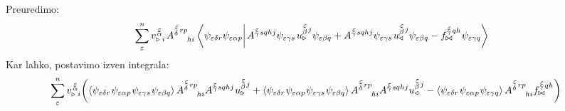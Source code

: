 Preuredimo:
\begin{equation*}
   \sum^n_\varepsilon
   v^{\mkern 2mu \substack{\varepsilon \\[-0.63mm] \alpha \\[-0.2mm]}}_{\triangleright \mkern5mu i} \mkern2mu     A^{\substack{\mkern2mu \varepsilon \\[0.12mm] \delta} \mkern2mu r p}_{\mkern29mu hi}
   \braket{
      \psi_{ \varepsilon \delta r}     \psi_{\varepsilon \alpha p} }
   {
      \mkern2mu A^{\substack{\mkern2mu \varepsilon \\[-0.59mm] \gamma} \mkern2mu s q h j}     \psi_{\varepsilon \gamma s} \mkern2mu
      u^{\substack{\mkern2mu \varepsilon \\[0.09mm] \beta} \mkern2mu j}_\triangleright     \psi_{\varepsilon \beta q}
      +
      A^{\substack{\mkern2mu \varepsilon \\[-0.59mm] \gamma} \mkern2mu s q h j}    \psi_{\varepsilon \gamma s} \mkern2mu
      u^{\substack{\mkern2mu \varepsilon \\[0.09mm] \beta} \mkern2mu j}_\triangleleft     \psi_{\varepsilon \beta q}
      -
      f^{\substack{\mkern2mu \varepsilon \\[-0.59mm] \gamma} \mkern2mu q h}_{\bowtie} \mkern1mu    \psi_{\varepsilon \gamma q} }
\end{equation*}
Kar lahko, postavimo izven integrala:
\begin{equation*}
   \mkern-20mu \sum^n_\varepsilon   v^{\mkern 2mu \substack{\varepsilon \\[-0.5mm] \alpha \\[-0.2mm]}}_{\triangleright \mkern5mu i}
   \qty( \expval{ \psi_{ \varepsilon \delta r} \mkern1mu    \psi_{\varepsilon \alpha p} \mkern1mu    \psi_{\varepsilon \gamma s} \mkern1mu    \psi_{\varepsilon \beta q} }
   A^{\substack{\mkern2mu \varepsilon \\[0.12mm] \delta} \mkern2mu r p}_{\mkern29mu hi}    A^{\substack{\mkern2mu \varepsilon \\[-0.59mm] \gamma} \mkern2mu s q h j} \mkern1mu     u^{\substack{\mkern2mu \varepsilon \\[0.14mm] \beta} \mkern2mu j}_\triangleright
   +
   \expval{ \psi_{ \varepsilon \delta r} \mkern1mu    \psi_{\varepsilon \alpha p} \mkern1mu    \psi_{\varepsilon \gamma s} \mkern1mu    \psi_{\varepsilon \beta q} }
   A^{\substack{\mkern2mu \varepsilon \\[0.12mm] \delta} \mkern2mu r p}_{\mkern29mu hi}    A^{\substack{\mkern2mu \varepsilon \\[-0.59mm] \gamma} \mkern2mu s q h j}    u^{\substack{\mkern2mu \varepsilon \\[0.14mm] \beta} \mkern2mu j}_\triangleleft
   -
   \expval{ \psi_{ \varepsilon \delta r} \mkern1mu    \psi_{\varepsilon \alpha p} \mkern1mu    \psi_{\varepsilon \gamma q} }    A^{\substack{\mkern2mu \varepsilon \\[0.12mm] \delta} \mkern2mu r p}_{\mkern29mu hi}    f^{\substack{\mkern2mu \varepsilon \\[-0.59mm] \gamma} \mkern2mu q h}_{\bowtie} )
\end{equation*}
